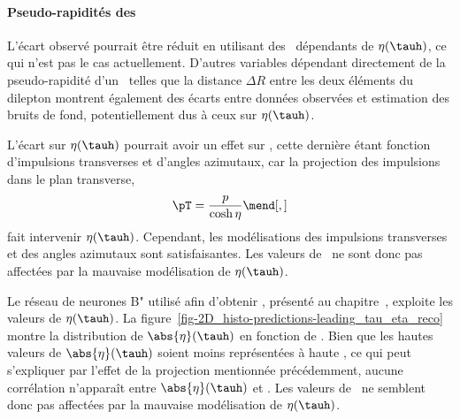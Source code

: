 {\paragraph{Pseudo-rapidités des \tauh}
L'écart observé pourrait être réduit
en utilisant des \fakefactors\ dépendants de $\eta(\tauh)$,
ce qui n'est pas le cas actuellement.
D'autres variables dépendant directement de la pseudo-rapidité d'un \tauh\ telles que
la distance $\Delta R$ entre les deux éléments du dilepton
montrent également des écarts entre
données observées et estimation des bruits de fond,
potentiellement dus à ceux sur $\eta(\tauh)$.
\par
L'écart sur $\eta(\tauh)$ pourrait avoir un effet sur \mTtot,
cette dernière étant fonction d'impulsions transverses et d'angles azimutaux,
car la projection des impulsions dans le plan transverse,
\begin{equation}
\pT = \frac{p}{\cosh \eta}
\mend[,]
\end{equation}
fait intervenir $\eta(\tauh)$.
Cependant, les modélisations des impulsions transverses et des angles azimutaux sont satisfaisantes.
Les valeurs de \mTtot\ ne sont donc pas affectées par la mauvaise modélisation de $\eta(\tauh)$.
\par
Le réseau de neurones B" utilisé afin d'obtenir \mml, présenté au chapitre~, exploite les valeurs de $\eta(\tauh)$.
La figure~\ref{fig-2D_histo-predictions-leading_tau_eta_reco} montre la distribution de $\abs{\eta}(\tauh)$ en fonction de \mml.
Bien que les hautes valeurs de $\abs{\eta}(\tauh)$ soient moins représentées à haute \mml,
ce qui peut s'expliquer par l'effet de la projection mentionnée précédemment,
aucune corrélation n'apparaît entre $\abs{\eta}(\tauh)$ et \mml.
Les valeurs de \mml\ ne semblent donc pas affectées par la mauvaise modélisation de $\eta(\tauh)$.
}
